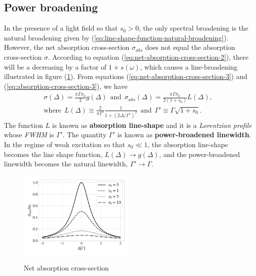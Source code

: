 \subsection{Power broadening}
\label{sec:power-broadening}

In the presence of a light field so that $ s_0 > 0 $, the only spectral broadening is the natural broadening given by (\ref{eq:line-shape-function-natural-broadening}). However, the net absorption cross-section $ \sigma_{abs} $ does not equal the absorption cross-section $ \sigma $. According to equation (\ref{eq:net-absorption-cross-section-2}), there will be a decreasing by a factor of $ 1 + s(\omega) $, which causes a line-broadening illustrated in figure (\ref{fig:net-absorption-cross-section}). From equations (\ref{eq:net-absorption-cross-section-3}) and (\ref{eq:absorption-cross-section-3}), we have
\begin{gather}
	\sigma(\Delta) = \frac{\pi \Gamma \sigma_0}{2} g(\Delta)\ \ \textrm{and}\ \ \sigma_{abs}(\Delta) = \frac{\pi \Gamma \sigma_0}{2(1 + s_0)} L(\Delta), 
	\\
	\textrm{where}\ \ L(\Delta) \equiv \frac{2}{\pi \Gamma'} \frac{1}{1 + (2\Delta / \Gamma')^2}\ \ \textrm{and}\ \ \Gamma' \equiv \Gamma \sqrt{1 + s_0}.
	\label{eq:absorption-line-shape}
\end{gather}
The function $ L $ is known as \textbf{absorption line-shape} and it is a \textit{Lorentzian profile} whose \textit{FWHM} is $ \Gamma' $. The quantity $ \Gamma' $ is known as \textbf{power-broadened linewidth}. In the regime of weak excitation so that $ s_0 \ll 1 $, the absorption line-shape becomes the line shape function, $ L(\Delta) \rightarrow g(\Delta) $, and the power-broadened linewidth becomes the natural linewidth, $ \Gamma' \rightarrow \Gamma $.

\begin{figure}[!ht]
	\centering
	\caption{Net absorption cross-section}
	\vspace{-5pt}
	\includegraphics[width=0.5\textwidth]{USPSC-img/net_absorption_cross_section.png}
	\vspace{-5pt}
	\label{fig:net-absorption-cross-section}
\end{figure}

